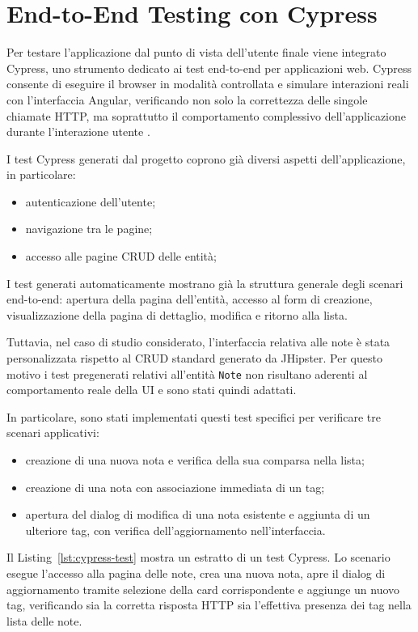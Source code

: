 \section{End-to-End Testing con Cypress}
\label{sec:cypress}

Per testare l'applicazione dal punto di vista dell'utente finale viene integrato Cypress, uno strumento dedicato ai test end-to-end per applicazioni web. Cypress consente di eseguire il browser in modalità controllata e simulare interazioni reali con l'interfaccia Angular, verificando non solo la correttezza delle singole chiamate HTTP, ma soprattutto il comportamento complessivo dell'applicazione durante l'interazione utente \cite{CypressDocs}.

I test Cypress generati dal progetto coprono già diversi aspetti dell’applicazione, in particolare:

\begin{itemize}
	\item autenticazione dell’utente;
	\item navigazione tra le pagine;
	\item accesso alle pagine CRUD delle entità;
\end{itemize}

I test generati automaticamente mostrano già la struttura generale degli scenari end-to-end: apertura della pagina dell’entità, accesso al form di creazione, visualizzazione della pagina di dettaglio, modifica e ritorno alla lista.

Tuttavia, nel caso di studio considerato, l'interfaccia relativa alle note è stata personalizzata rispetto al CRUD standard generato da JHipster. Per questo motivo i test pregenerati relativi all'entità \texttt{Note} non risultano aderenti al comportamento reale della UI e sono stati quindi adattati.

In particolare, sono stati implementati questi test specifici per verificare tre scenari applicativi:

\begin{itemize}
	\item creazione di una nuova nota e verifica della sua comparsa nella lista;
	\item creazione di una nota con associazione immediata di un tag;
	\item apertura del dialog di modifica di una nota esistente e aggiunta di un ulteriore tag, con verifica dell'aggiornamento nell'interfaccia.
\end{itemize}

Il Listing~\ref{lst:cypress-test} mostra un estratto di un test Cypress. Lo scenario esegue l'accesso alla pagina delle note, crea una nuova nota, apre il dialog di aggiornamento tramite selezione della card corrispondente e aggiunge un nuovo tag, verificando sia la corretta risposta HTTP sia l'effettiva presenza dei tag nella lista delle note.

